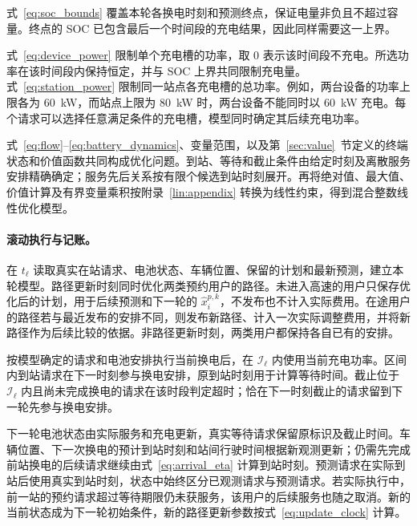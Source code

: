 式~\eqref{eq:soc_bounds} 覆盖本轮各换电时刻和预测终点，保证电量非负且不超过容量。终点的 SOC 已包含最后一个时间段的充电结果，因此同样需要这一上界。

式~\eqref{eq:device_power} 限制单个充电槽的功率，取 $0$ 表示该时间段不充电。所选功率在该时间段内保持恒定，并与 SOC 上界共同限制充电量。式~\eqref{eq:station_power} 限制同一站点各充电槽的总功率。例如，两台设备的功率上限各为 $60$~kW，而站点上限为 $80$~kW 时，两台设备不能同时以 $60$~kW 充电。每个请求可以选择任意满足条件的充电槽，模型同时确定其后续充电功率。

式~\eqref{eq:flow}--\eqref{eq:battery_dynamics}、变量范围，以及第~\ref{sec:value}~节定义的终端状态和价值函数共同构成优化问题。到站、等待和截止条件由给定时刻及离散服务安排精确确定；服务先后关系按有限个候选到站时刻展开。再将绝对值、最大值、价值计算及有界变量乘积按附录~\ref{lin:appendix} 转换为线性约束，得到混合整数线性优化模型。

\paragraph{滚动执行与记账。}
在 $t_\ell$ 读取真实在站请求、电池状态、车辆位置、保留的计划和最新预测，建立本轮模型。路径更新时刻同时优化两类预约用户的路径。未进入高速的用户只保存优化后的计划，用于后续预测和下一轮的 $\widehat x_i^{p,k}$，不发布也不计入实际费用。在途用户的路径若与最近发布的安排不同，则发布新路径、计入一次实际调整费用，并将新路径作为后续比较的依据。非路径更新时刻，两类用户都保持各自已有的安排。

按模型确定的请求和电池安排执行当前换电后，在 $\mathcal I_\ell$ 内使用当前充电功率。区间内到站请求在下一时刻参与换电安排，原到站时刻用于计算等待时间。截止位于 $\mathcal I_\ell$ 内且尚未完成换电的请求在该时段判定超时；恰在下一时刻截止的请求留到下一轮先参与换电安排。

下一轮电池状态由实际服务和充电更新，真实等待请求保留原标识及截止时间。车辆位置、下一次换电的预计到站时刻和站间行驶时间根据新观测更新；仍需先完成前站换电的后续请求继续由式~\eqref{eq:arrival_eta} 计算到站时刻。预测请求在实际到站后使用真实到站时刻，状态中始终区分已观测请求与预测请求。若实际执行中，前一站的预约请求超过等待期限仍未获服务，该用户的后续服务也随之取消。新的当前状态成为下一轮初始条件，新的路径更新参数按式~\eqref{eq:update_clock} 计算。
